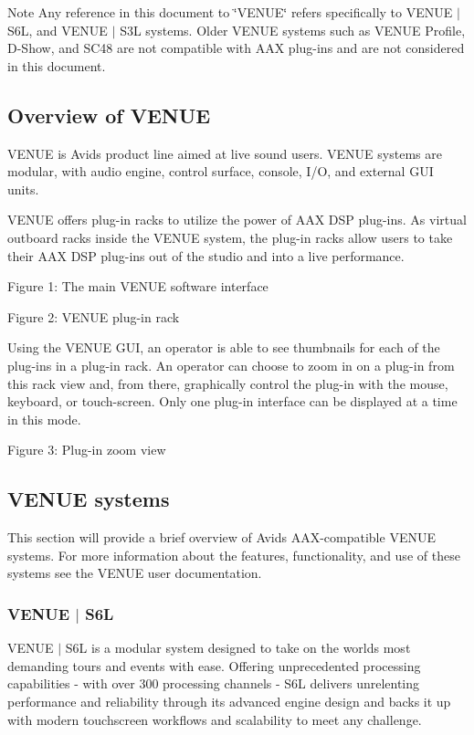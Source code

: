 \begin{DoxyNote}{Note}
Any reference in this document to \char`\"{}\+V\+E\+N\+U\+E\char`\"{} refers specifically to V\+E\+N\+U\+E $\vert$ S6\+L, and V\+E\+N\+U\+E $\vert$ S3\+L systems. Older V\+E\+N\+U\+E systems such as V\+E\+N\+U\+E Profile, D-\/\+Show, and S\+C48 are not compatible with A\+A\+X plug-\/ins and are not considered in this document.
\end{DoxyNote}


 \hypertarget{a00377_aax_venue_guide__overview}{}\subsection{Overview of V\+E\+N\+U\+E}\label{a00377_aax_venue_guide__overview}
 V\+E\+N\+U\+E is Avid\textquotesingle{}s product line aimed at live sound users. V\+E\+N\+U\+E systems are modular, with audio engine, control surface, console, I/\+O, and external G\+U\+I units.

 V\+E\+N\+U\+E offers plug-\/in racks to utilize the power of A\+A\+X D\+S\+P plug-\/ins. As virtual outboard racks inside the V\+E\+N\+U\+E system, the plug-\/in racks allow users to take their A\+A\+X D\+S\+P plug-\/ins out of the studio and into a live performance.

  Figure 1\+: The main V\+E\+N\+U\+E software interface

  Figure 2\+: V\+E\+N\+U\+E plug-\/in rack

 Using the V\+E\+N\+U\+E G\+U\+I, an operator is able to see thumbnails for each of the plug-\/ins in a plug-\/in rack. An operator can choose to zoom in on a plug-\/in from this rack view and, from there, graphically control the plug-\/in with the mouse, keyboard, or touch-\/screen. Only one plug-\/in interface can be displayed at a time in this mode.

  Figure 3\+: Plug-\/in zoom view



 \hypertarget{a00377_aax_venue_guide__systems}{}\subsection{V\+E\+N\+U\+E systems}\label{a00377_aax_venue_guide__systems}
 This section will provide a brief overview of Avid\textquotesingle{}s A\+A\+X-\/compatible V\+E\+N\+U\+E systems. For more information about the features, functionality, and use of these systems see the V\+E\+N\+U\+E user documentation.

\hypertarget{a00377_aax_venue_guide__systems__s6l}{}\subsubsection{V\+E\+N\+U\+E $\vert$ S6\+L}\label{a00377_aax_venue_guide__systems__s6l}
 V\+E\+N\+U\+E $\vert$ S6\+L is a modular system designed to take on the world\textquotesingle{}s most demanding tours and events with ease. Offering unprecedented processing capabilities -\/ with over 300 processing channels -\/ S6\+L delivers unrelenting performance and reliability through its advanced engine design and backs it up with modern touchscreen workflows and scalability to meet any challenge.

